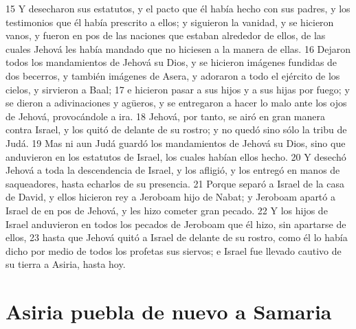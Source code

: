 15 Y desecharon sus estatutos, y el pacto que él había hecho con sus padres, y los testimonios que él había prescrito a ellos; y siguieron la vanidad, y se hicieron vanos, y fueron en pos de las naciones que estaban alrededor de ellos, de las cuales Jehová les había mandado que no hiciesen a la manera de ellas.
16 Dejaron todos los mandamientos de Jehová su Dios, y se hicieron imágenes fundidas de dos becerros, y también imágenes de Asera, y adoraron a todo el ejército de los cielos, y sirvieron a Baal;
17 e hicieron pasar a sus hijos y a sus hijas por fuego; y se dieron a adivinaciones y agüeros, y se entregaron a hacer lo malo ante los ojos de Jehová, provocándole a ira.
18 Jehová, por tanto, se airó en gran manera contra Israel, y los quitó de delante de su rostro; y no quedó sino sólo la tribu de Judá.
19 Mas ni aun Judá guardó los mandamientos de Jehová su Dios, sino que anduvieron en los estatutos de Israel, los cuales habían ellos hecho.
20 Y desechó Jehová a toda la descendencia de Israel, y los afligió, y los entregó en manos de saqueadores, hasta echarlos de su presencia.
21 Porque separó a Israel de la casa de David, y ellos hicieron rey a Jeroboam hijo de Nabat; y Jeroboam apartó a Israel de en pos de Jehová, y les hizo cometer gran pecado.
22 Y los hijos de Israel anduvieron en todos los pecados de Jeroboam que él hizo, sin apartarse de ellos,
23 hasta que Jehová quitó a Israel de delante de su rostro, como él lo había dicho por medio de todos los profetas sus siervos; e Israel fue llevado cautivo de su tierra a Asiria, hasta hoy.
\section*{Asiria puebla de nuevo a Samaria}

